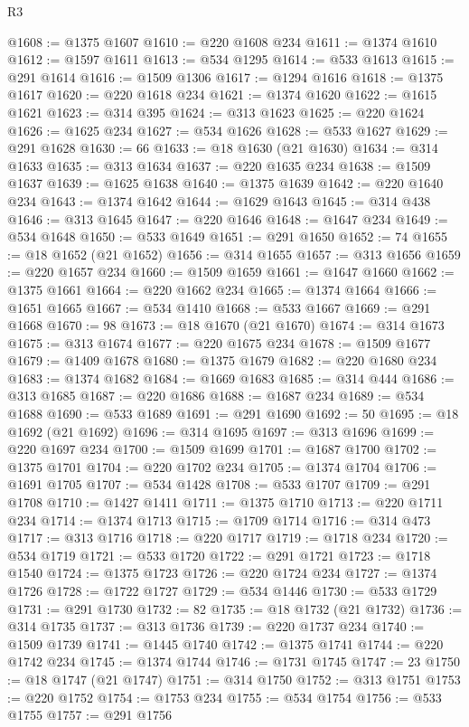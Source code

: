 \begin{lexlean}{R3}
\begin{coremodule}
@1608 := @1375 @1607
@1610 := @220 @1608 @234
@1611 := @1374 @1610
@1612 := @1597 @1611
@1613 := @534 @1295
@1614 := @533 @1613
@1615 := @291 @1614
@1616 := @1509 @1306
@1617 := @1294 @1616
@1618 := @1375 @1617
@1620 := @220 @1618 @234
@1621 := @1374 @1620
@1622 := @1615 @1621
@1623 := @314 @395
@1624 := @313 @1623
@1625 := @220 @1624
@1626 := @1625 @234
@1627 := @534 @1626
@1628 := @533 @1627
@1629 := @291 @1628
@1630 := 66
@1633 := @18 @1630 (@21 @1630)
@1634 := @314 @1633
@1635 := @313 @1634
@1637 := @220 @1635 @234
@1638 := @1509 @1637
@1639 := @1625 @1638
@1640 := @1375 @1639
@1642 := @220 @1640 @234
@1643 := @1374 @1642
@1644 := @1629 @1643
@1645 := @314 @438
@1646 := @313 @1645
@1647 := @220 @1646
@1648 := @1647 @234
@1649 := @534 @1648
@1650 := @533 @1649
@1651 := @291 @1650
@1652 := 74
@1655 := @18 @1652 (@21 @1652)
@1656 := @314 @1655
@1657 := @313 @1656
@1659 := @220 @1657 @234
@1660 := @1509 @1659
@1661 := @1647 @1660
@1662 := @1375 @1661
@1664 := @220 @1662 @234
@1665 := @1374 @1664
@1666 := @1651 @1665
@1667 := @534 @1410
@1668 := @533 @1667
@1669 := @291 @1668
@1670 := 98
@1673 := @18 @1670 (@21 @1670)
@1674 := @314 @1673
@1675 := @313 @1674
@1677 := @220 @1675 @234
@1678 := @1509 @1677
@1679 := @1409 @1678
@1680 := @1375 @1679
@1682 := @220 @1680 @234
@1683 := @1374 @1682
@1684 := @1669 @1683
@1685 := @314 @444
@1686 := @313 @1685
@1687 := @220 @1686
@1688 := @1687 @234
@1689 := @534 @1688
@1690 := @533 @1689
@1691 := @291 @1690
@1692 := 50
@1695 := @18 @1692 (@21 @1692)
@1696 := @314 @1695
@1697 := @313 @1696
@1699 := @220 @1697 @234
@1700 := @1509 @1699
@1701 := @1687 @1700
@1702 := @1375 @1701
@1704 := @220 @1702 @234
@1705 := @1374 @1704
@1706 := @1691 @1705
@1707 := @534 @1428
@1708 := @533 @1707
@1709 := @291 @1708
@1710 := @1427 @1411
@1711 := @1375 @1710
@1713 := @220 @1711 @234
@1714 := @1374 @1713
@1715 := @1709 @1714
@1716 := @314 @473
@1717 := @313 @1716
@1718 := @220 @1717
@1719 := @1718 @234
@1720 := @534 @1719
@1721 := @533 @1720
@1722 := @291 @1721
@1723 := @1718 @1540
@1724 := @1375 @1723
@1726 := @220 @1724 @234
@1727 := @1374 @1726
@1728 := @1722 @1727
@1729 := @534 @1446
@1730 := @533 @1729
@1731 := @291 @1730
@1732 := 82
@1735 := @18 @1732 (@21 @1732)
@1736 := @314 @1735
@1737 := @313 @1736
@1739 := @220 @1737 @234
@1740 := @1509 @1739
@1741 := @1445 @1740
@1742 := @1375 @1741
@1744 := @220 @1742 @234
@1745 := @1374 @1744
@1746 := @1731 @1745
@1747 := 23
@1750 := @18 @1747 (@21 @1747)
@1751 := @314 @1750
@1752 := @313 @1751
@1753 := @220 @1752
@1754 := @1753 @234
@1755 := @534 @1754
@1756 := @533 @1755
@1757 := @291 @1756

\end{coremodule}
\end{lexlean}
